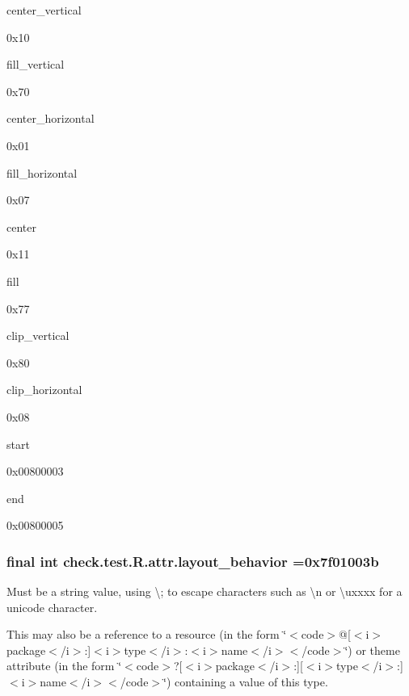 {\ttfamily center\+\_\+vertical}

0x10

{\ttfamily fill\+\_\+vertical}

0x70

{\ttfamily center\+\_\+horizontal}

0x01

{\ttfamily fill\+\_\+horizontal}

0x07

{\ttfamily center}

0x11

{\ttfamily fill}

0x77

{\ttfamily clip\+\_\+vertical}

0x80

{\ttfamily clip\+\_\+horizontal}

0x08

{\ttfamily start}

0x00800003

{\ttfamily end}

0x00800005\hypertarget{classcheck_1_1test_1_1_r_1_1attr_aa93dbcd477d2bd01b579801fd1bff846}{}
\subsubsection[{layout\+\_\+behavior}]{\setlength{\rightskip}{0pt plus 5cm}final int check.\+test.\+R.\+attr.\+layout\+\_\+behavior =0x7f01003b\hspace{0.3cm}{\ttfamily [static]}}\label{classcheck_1_1test_1_1_r_1_1attr_aa93dbcd477d2bd01b579801fd1bff846}
Must be a string value, using \textquotesingle{}\textbackslash{};\textquotesingle{} to escape characters such as \textquotesingle{}\textbackslash{}n\textquotesingle{} or \textquotesingle{}\textbackslash{}uxxxx\textquotesingle{} for a unicode character. 

This may also be a reference to a resource (in the form \char`\"{}$<$code$>$@\mbox{[}$<$i$>$package$<$/i$>$\+:\mbox{]}$<$i$>$type$<$/i$>$\+:$<$i$>$name$<$/i$>$$<$/code$>$\char`\"{}) or theme attribute (in the form \char`\"{}$<$code$>$?\mbox{[}$<$i$>$package$<$/i$>$\+:\mbox{]}\mbox{[}$<$i$>$type$<$/i$>$\+:\mbox{]}$<$i$>$name$<$/i$>$$<$/code$>$\char`\"{}) containing a value of this type. \hypertarget{classcheck_1_1test_1_1_r_1_1attr_a88021fcc3cb9014c95731b525c8c7a13}{}
